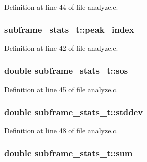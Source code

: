 Definition at line 44 of file analyze.\+c.

\subsubsection[{\texorpdfstring{peak\+\_\+index}{peak_index}}]{ subframe\+\_\+stats\+\_\+t\+::peak\+\_\+index}\hypertarget{structsubframe__stats__t_ac8b291b30f10f9d79b68e654fcbbec86}{}\label{structsubframe__stats__t_ac8b291b30f10f9d79b68e654fcbbec86}


Definition at line 42 of file analyze.\+c.

\subsubsection[{\texorpdfstring{sos}{sos}}]{\setlength{\rightskip}{0pt plus 5cm}double subframe\+\_\+stats\+\_\+t\+::sos}\hypertarget{structsubframe__stats__t_a772a12905f1c3a79da8065e3f1fb163c}{}\label{structsubframe__stats__t_a772a12905f1c3a79da8065e3f1fb163c}


Definition at line 45 of file analyze.\+c.

\subsubsection[{\texorpdfstring{stddev}{stddev}}]{\setlength{\rightskip}{0pt plus 5cm}double subframe\+\_\+stats\+\_\+t\+::stddev}\hypertarget{structsubframe__stats__t_a3c472ff929722bf035a792b6ca855cf4}{}\label{structsubframe__stats__t_a3c472ff929722bf035a792b6ca855cf4}


Definition at line 48 of file analyze.\+c.

\subsubsection[{\texorpdfstring{sum}{sum}}]{\setlength{\rightskip}{0pt plus 5cm}double subframe\+\_\+stats\+\_\+t\+::sum}\hypertarget{structsubframe__stats__t_a83003065be8178100e1b6f138a1b89a5}{}\label{structsubframe__stats__t_a83003065be8178100e1b6f138a1b89a5}


